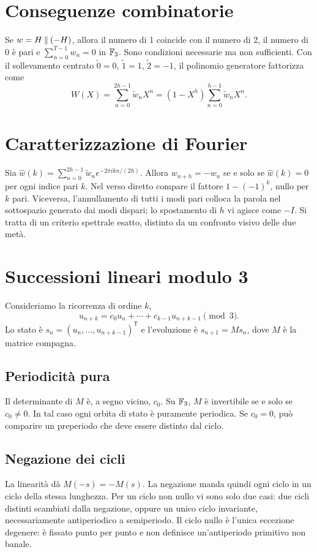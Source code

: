 \documentclass[11pt,a4paper]{article}
\begin{document}
\section{Conseguenze combinatorie}
Se \(w=H\mathbin{\Vert}(-H)\), allora il numero di 1 coincide con il numero di 2, il numero di 0 è pari e \(\sum_{n=0}^{T-1}w_n=0\) in \(\mathbb F_3\). Sono condizioni necessarie ma non sufficienti. Con il sollevamento centrato \(\widetilde0=0\), \(\widetilde1=1\), \(\widetilde2=-1\), il polinomio generatore fattorizza come \[W(X)=\sum_{n=0}^{2h-1}\widetilde w_nX^n=(1-X^h)\sum_{n=0}^{h-1}\widetilde w_nX^n.\]
\section{Caratterizzazione di Fourier}
Sia \(\widehat w(k)=\sum_{n=0}^{2h-1}\widetilde w_ne^{-2\pi i kn/(2h)}\). Allora \(w_{n+h}=-w_n\) se e solo se \(\widehat w(k)=0\) per ogni indice pari \(k\). Nel verso diretto compare il fattore \(1-(-1)^k\), nullo per \(k\) pari. Viceversa, l’annullamento di tutti i modi pari colloca la parola nel sottospazio generato dai modi dispari; lo spostamento di \(h\) vi agisce come \(-I\). Si tratta di un criterio spettrale esatto, distinto da un confronto visivo delle due metà.
\section{Successioni lineari modulo 3}
Consideriamo la ricorrenza di ordine \(k\), \[u_{n+k}=c_0u_n+\cdots+c_{k-1}u_{n+k-1}\pmod3.\] Lo stato è \(s_n=(u_n,\ldots,u_{n+k-1})^{\mathsf T}\) e l’evoluzione è \(s_{n+1}=Ms_n\), dove \(M\) è la matrice compagna.
\subsection{Periodicità pura}
Il determinante di \(M\) è, a segno vicino, \(c_0\). Su \(\mathbb F_3\), \(M\) è invertibile se e solo se \(c_0\neq0\). In tal caso ogni orbita di stato è puramente periodica. Se \(c_0=0\), può comparire un preperiodo che deve essere distinto dal ciclo.
\subsection{Negazione dei cicli}
La linearità dà \(M(-s)=-M(s)\). La negazione manda quindi ogni ciclo in un ciclo della stessa lunghezza. Per un ciclo non nullo vi sono solo due casi: due cicli distinti scambiati dalla negazione, oppure un unico ciclo invariante, necessariamente antiperiodico a semiperiodo. Il ciclo nullo è l’unica eccezione degenere: è fissato punto per punto e non definisce un’antiperiodo primitivo non banale.
\end{document}
